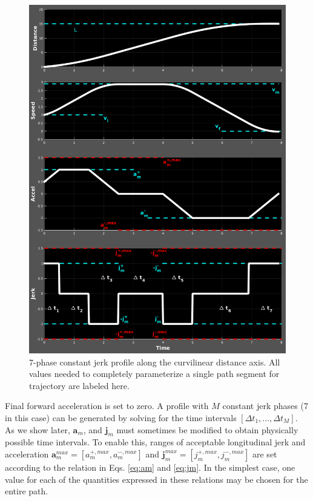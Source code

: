\documentclass[letterpaper, 10 pt, conference]{ieeeconf}  %
\begin{document}
\begin{figure}[tb]
  \centering
  \includegraphics[width=1.0\columnwidth]{graphics/Full7PhaseSpecVertical.png}
  \caption{
    7-phase constant jerk profile along the curvilinear distance axis.
    All values needed to completely parameterize a single path segment for trajectory are labeled here.}
  \label{fig:full7phasespec}
\end{figure}


Final forward acceleration is set to zero.
A profile with $M$ constant jerk phases (7 in this case) can be generated by solving for the time intervals $[\Delta t_1, ..., \Delta t_M]$.
As we show later, $\mathbf{a}_m$, and $\mathbf{j}_m$ must sometimes be modified to obtain physically possible time intervals.
To enable this, ranges of acceptable longitudinal jerk and acceleration $\mathbf{a}^{max}_m = [a^{+,max}_m , a^{-,max}_m]$ and $\mathbf{j}^{max}_m = [j^{+,max}_m , j^{-,max}_m]$ are set according to the relation in Eqs. \ref{eq:am} and \ref{eq:jm}.
In the simplest case, one value for each of the quantities expressed in these relations may be chosen for the entire path.
\end{document}
